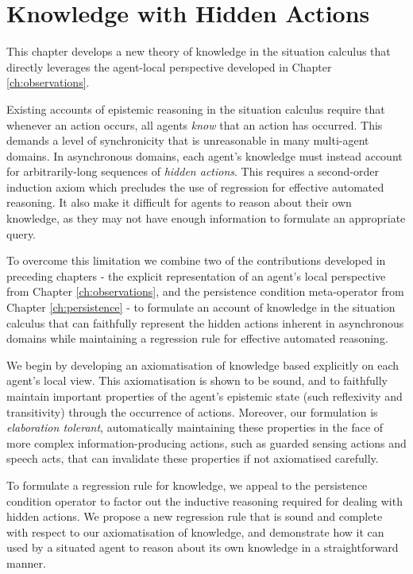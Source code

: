 

\chapter{Knowledge with Hidden Actions}

\label{ch:knowledge}

This chapter develops a new theory of knowledge in the situation calculus
that directly leverages the agent-local perspective developed in Chapter
\ref{ch:observations}.

Existing accounts of epistemic reasoning in the situation calculus
require that whenever an action occurs, all agents \emph{know} that
an action has occurred. This demands a level of synchronicity that
is unreasonable in many multi-agent domains. In asynchronous domains,
each agent's knowledge must instead account for arbitrarily-long sequences
of \emph{hidden actions}. This requires a second-order induction axiom
which precludes the use of regression for effective automated reasoning.
It also make it difficult for agents to reason about their own knowledge,
as they may not have enough information to formulate an appropriate
query.

To overcome this limitation we combine two of the contributions developed
in preceding chapters - the explicit representation of an agent's
local perspective from Chapter \ref{ch:observations}, and the persistence
condition meta-operator from Chapter \ref{ch:persistence} - to formulate
an account of knowledge in the situation calculus that can faithfully
represent the hidden actions inherent in asynchronous domains while
maintaining a regression rule for effective automated reasoning.

We begin by developing an axiomatisation of knowledge based explicitly
on each agent's local view. This axiomatisation is shown to be sound,
and to faithfully maintain important properties of the agent's epistemic
state (such reflexivity and transitivity) through the occurrence of
actions. Moreover, our formulation is \emph{elaboration tolerant},
automatically maintaining these properties in the face of more complex
information-producing actions, such as guarded sensing actions and
speech acts, that can invalidate these properties if not axiomatised
carefully.

To formulate a regression rule for knowledge, we appeal to the persistence
condition operator to factor out the inductive reasoning required
for dealing with hidden actions. We propose a new regression rule
that is sound and complete with respect to our axiomatisation of knowledge,
and demonstrate how it can used by a situated agent to reason about
its own knowledge in a straightforward manner.

